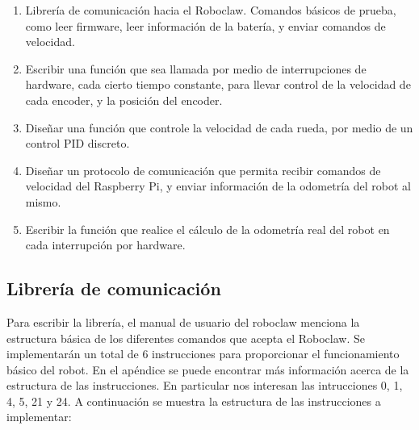 \begin{enumerate}
\item Librería de comunicación hacia el Roboclaw. Comandos básicos de prueba, como leer firmware, leer información de la batería, y enviar comandos de velocidad.
\item Escribir una función que sea llamada por medio de interrupciones de hardware, cada cierto tiempo constante, para llevar control de la velocidad de cada encoder, y la posición del encoder.
\item Diseñar una función que controle la velocidad de cada rueda, por medio de un control PID discreto.
\item Diseñar un protocolo de comunicación que permita recibir comandos de velocidad del Raspberry Pi, y enviar información de la odometría del robot al mismo.
\item Escribir la función que realice el cálculo de la odometría real del robot en cada interrupción por hardware.
\end{enumerate}

\subsection{Librería de comunicación}
Para escribir la librería, el manual de usuario del roboclaw menciona la estructura básica de los diferentes comandos que acepta el Roboclaw. Se implementarán un total de 6 instrucciones para proporcionar el funcionamiento básico del robot. En el apéndice se puede encontrar más información acerca de la estructura de las instrucciones. En particular nos interesan las intrucciones 0, 1, 4, 5, 21 y 24. A continuación se muestra la estructura de las instrucciones a implementar:

